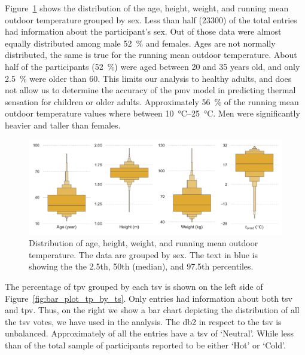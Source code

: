 Figure~\ref{fig:dist_other_data} shows the distribution of the age, height, weight, and running mean outdoor temperature grouped by sex.
Less than half (\num{23300}) of the total entries had information about the participant's sex.
Out of those data were almost equally distributed among male \qty{52}{\percent} and females.
Ages are not normally distributed, the same is true for the running mean outdoor temperature.
About half of the participants (\qty{52}{\percent}) were aged between \num{20} and \num{35} years old, and only \qty{2.5}{\percent} were older than 60.
This limits our analysis to healthy adults, and does not allow us to determine the accuracy of the \ac{pmv} model in predicting thermal sensation for children or older adults.
Approximately \qty{56}{\percent} of the running mean outdoor temperature values where between \qtyrange{10}{25}{\celsius}.
Men were significantly heavier and taller than females.
\begin{figure}[htb!]
    \centering
    \includegraphics[width=\textwidth]{figures/dist_other_data}
    \caption{Distribution of age, height, weight, and running mean outdoor temperature.
    The data are grouped by sex.
    The text in blue is showing the the 2.5th, 50th (median), and 97.5th percentiles.}
    \label{fig:dist_other_data}
\end{figure}
The percentage of \ac{tpv} grouped by each \ac{tsv} is shown on the left side of Figure~\ref{fig:bar_plot_tp_by_ts}.
Only  entries had information about both \ac{tsv} and \ac{tpv}.
Thus, on the right we show a bar chart depicting the distribution of all the \ac{tsv} votes, we have used in the analysis.
The \gls{db2} in respect to the \ac{tsv} is unbalanced.
Approximately  of all the entries have a \ac{tsv} of `Neutral'.
While less than  of the total sample of participants reported to be either `Hot' or `Cold'.
